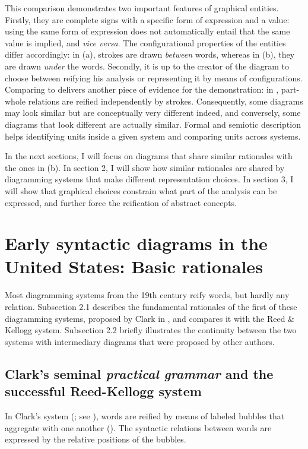 \documentclass[output=paper]{langsci/langscibook}
\begin{document}
This comparison demonstrates two important features of graphical entities. Firstly, they are complete signs with a specific form of expression and a value: using the same form of expression does not automatically entail that the same value is implied, and \textit{vice versa}. The configurational properties of the entities differ accordingly: in (a), strokes are drawn \textit{between} words, whereas in (b), they are drawn \textit{under} the words. Secondly, it is up to the creator of the diagram to choose between reifying his analysis or representing it by means of configurations. Comparing  to  delivers another piece of evidence for the demonstration: in , part-whole relations are reified independently by strokes. Consequently, some diagrams may look similar but are conceptually very different indeed, and conversely, some diagrams that look different are actually similar. Formal and semiotic description helps identifying units inside a given system and comparing units across systems. 

In the next sections, I will focus on diagrams that share similar rationales with the ones in (b). In section 2, I will show how similar rationales are shared by diagramming systems that make different representation choices. In section 3, I will show that graphical choices constrain what part of the analysis can be expressed, and further force the reification of abstract concepts.

\section{Early syntactic diagrams in the United States: Basic rationales}

Most diagramming systems from the 19th century reify words, but hardly any relation. Subsection 2.1 describes the fundamental rationales of the first of these diagramming systems, proposed by Clark in \citeyear{clark_science_1847}, and compares it with the Reed \& Kellogg system. Subsection 2.2 briefly illustrates the continuity between the two systems with intermediary diagrams that were proposed by other authors.

\subsection{Clark’s seminal \textit{practical grammar} and the successful Reed-Kellogg system}

In Clark’s system (\citeyear{clark_science_1847}; see \citealt{mazziotta_drawing_2016}), words are reified by means of labeled bubbles that aggregate with one another (). The syntactic relations between words are expressed by the relative positions of the bubbles. 
\end{document}
